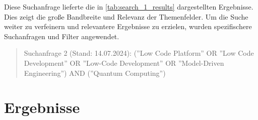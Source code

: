 Diese Suchanfrage lieferte die in \ref{tab:search_1_results} dargestellten Ergebnisse. Dies 
zeigt die große Bandbreite und Relevanz der Themenfelder. Um die Suche weiter zu verfeinern und 
relevantere Ergebnisse zu erzielen, wurden spezifischere Suchanfragen und Filter angewendet.


\begin{quote}
    Suchanfrage 2 (Stand: 14.07.2024):
    (''Low Code Platform'' OR ''Low Code Development'' OR ''Low-Code Development'' OR ''Model-Driven Engineering'') AND (''Quantum Computing'')
\end{quote}



\section{Ergebnisse}
